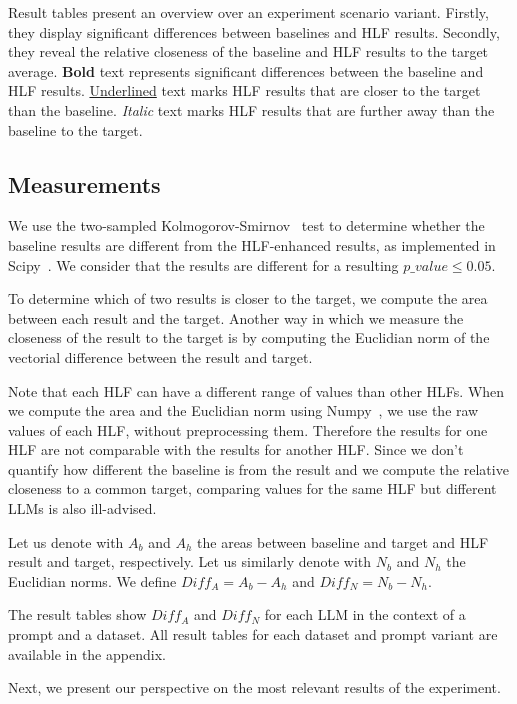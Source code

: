 \documentclass[11pt]{article}
\begin{document}
Result tables present an overview over an experiment scenario variant.
Firstly, they display significant differences between baselines and HLF results.
Secondly, they reveal the relative closeness of the baseline and HLF results to
the target average.
\textbf{Bold} text represents significant differences between the baseline and
HLF results.
\underline{Underlined} text marks HLF results that are closer to the target than
the baseline.
\textit{Italic} text marks HLF results that are further away than the baseline
to the target.

\subsection{Measurements}\label{subsec:measurements}

We use the two-sampled Kolmogorov-Smirnov~\cite{kolmogorov1933,smirnov1939} test
to determine whether the baseline results are different from the HLF-enhanced
results, as implemented in Scipy~\cite{2020SciPy-NMeth}.
We consider that the results are different for a resulting $p\_value \le 0.05$.

To determine which of two results is closer to the target, we compute the area
between each result and the target.
Another way in which we measure the closeness of the result to the target is by
computing the Euclidian norm of the vectorial difference between the result and
target.

Note that each HLF can have a different range of values than other HLFs.
When we compute the area and the Euclidian norm using Numpy~\cite{harris2020array},
we use the raw values of each HLF, without preprocessing them.
Therefore the results for one HLF are not comparable with the results for
another HLF.
Since we don't quantify how different the baseline is from the result and we
compute the relative closeness to a common target, comparing values for the same
HLF but different LLMs is also ill-advised.

Let us denote with $A_b$ and $A_h$ the areas between baseline and target and HLF
result and target, respectively.
Let us similarly denote with $N_b$ and $N_h$ the Euclidian norms.
We define $Diff_A = A_b - A_h$ and $Diff_N = N_b - N_h$.

The result tables show $Diff_A$ and $Diff_N$ for each LLM in the context of a
prompt and a dataset.
All result tables for each dataset and prompt variant are available in the
appendix.

Next, we present our perspective on the most relevant results of the experiment.
\end{document}
